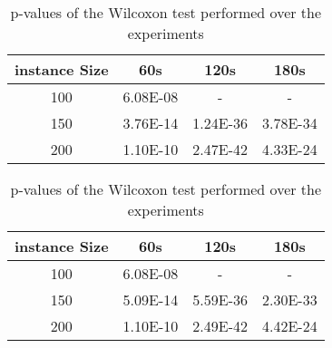 \begin{table}[H]
\centering
\caption{p-values of the Wilcoxon test performed over the experiments}
\label{tab:wilcoxon}
\begin{tabular}{c ccc}
\toprule
 instance Size &      60s &     120s &     180s \\
\midrule
           100 & 6.08E-08 &        - &        - \\
           150 & 3.76E-14 & 1.24E-36 & 3.78E-34 \\
           200 & 1.10E-10 & 2.47E-42 & 4.33E-24 \\
\bottomrule
\end{tabular}
\end{table}
\begin{table}[H]
\centering
\caption{p-values of the Wilcoxon test performed over the experiments}
\label{tab:wilcoxon}
\begin{tabular}{c ccc}
\toprule
 instance Size &      60s &     120s &     180s \\
\midrule
           100 & 6.08E-08 &        - &        - \\
           150 & 5.09E-14 & 5.59E-36 & 2.30E-33 \\
           200 & 1.10E-10 & 2.49E-42 & 4.42E-24 \\
\bottomrule
\end{tabular}
\end{table}
